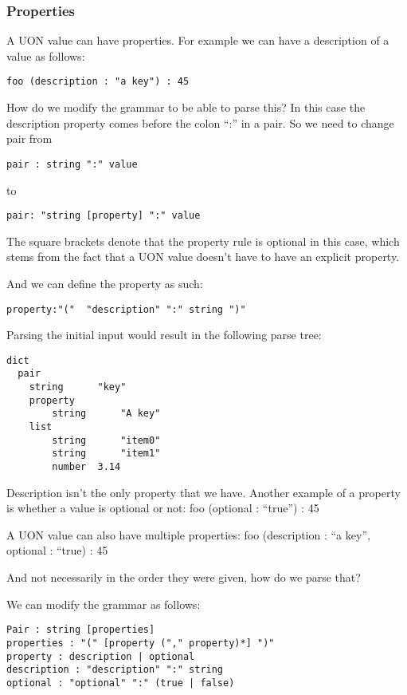 \documentclass[12pt]{article}
\begin{document}
\subsubsection{Properties}
A UON value can have properties. For example we can have a description of a value as follows:
\begin{lstlisting}
foo (description : "a key") : 45
\end{lstlisting}

How do we modify the grammar to be able to parse this? In this case the description property comes before the colon “:” in a pair. So we need to change pair from 

\begin{lstlisting}
pair : string ":" value
\end{lstlisting}

to

\begin{lstlisting}
pair: "string [property] ":" value
\end{lstlisting}
The square brackets denote that the property rule is optional in this case, which stems from the fact that a UON value doesn’t have to have an explicit property.

And we can define the property as such:

\begin{lstlisting}
property:"("  "description" ":" string ")"
\end{lstlisting}

Parsing the initial input would result in the following parse tree:

\begin{lstlisting}
dict
  pair
    string      "key"
    property
        string      "A key"
    list
        string      "item0"
        string      "item1"
        number  3.14
\end{lstlisting}

Description isn’t the only property that we have. Another example of a property is whether a value is optional or not:
foo (optional : “true”) : 45

A UON value can also have multiple properties:
foo (description : “a key”, optional : “true) : 45

And not necessarily in the order they were given, how do we parse that?

We can modify the grammar as follows: 

\begin{lstlisting}
Pair : string [properties]
properties : "(" [property ("," property)*] ")"
property : description | optional
description : "description" ":" string
optional : "optional" ":" (true | false)
\end{lstlisting}
\end{document}
